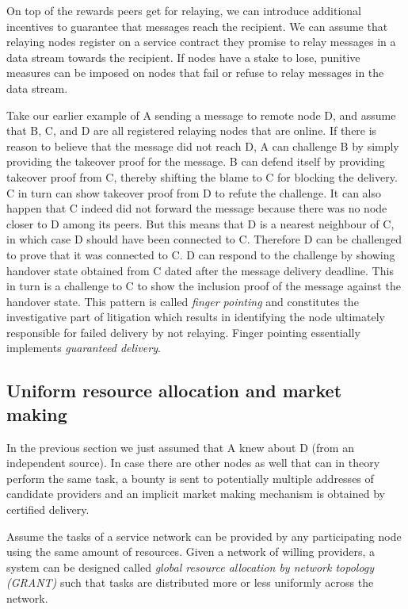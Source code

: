 \documentclass[a4paper,10pt]{article}
\newcommand\gloss[1]{\emph{\gls{#1}}}
\begin{document}
On top of the rewards peers get for relaying, we can introduce additional
incentives to guarantee that messages reach the recipient.
We can assume that relaying nodes register on a service contract they promise to relay messages in a data stream
towards the recipient.
If nodes have a stake to lose, punitive measures can be imposed on nodes that fail or refuse to relay messages in the data stream.

Take our earlier example of A sending a message to remote node D, and assume that
B, C, and D are all registered relaying nodes that are online. If there is reason
to believe that the message did not reach D, A can challenge B by simply providing
the takeover proof for the message. B can defend itself by providing takeover proof from C,
thereby shifting the blame to C for blocking the delivery. C in turn can show takeover proof
from D to refute the challenge. It can also happen that C indeed did not forward the message
because there was no node closer to D among its peers. But this means that
D is a nearest neighbour of C, in which case D should have been connected to C.
Therefore D can be challenged to prove that it was connected to C. D can respond to the challenge
by showing handover state obtained from C dated after the message delivery deadline. This in turn is
a challenge to C to show the inclusion proof of the message against the handover state.
This pattern is called \gloss{finger pointing} and constitutes the investigative part
of litigation which results in identifying the node
ultimately responsible for failed delivery by not relaying.
Finger pointing essentially implements \emph{guaranteed delivery}.

\subsection{Uniform resource allocation and market making}

In the previous section we just assumed that A knew about D (from an independent source).
In case there are other nodes as well that can in theory perform the same task,
a bounty is sent to potentially multiple addresses of candidate providers
and an implicit market making mechanism is obtained by certified delivery.

Assume the tasks of a service network can be provided by any participating node using
the same amount of resources. Given a network of willing providers, a system can be designed
called \gloss{global resource allocation by network topology (GRANT)}
such that tasks are distributed more or less uniformly across the network.
\end{document}
